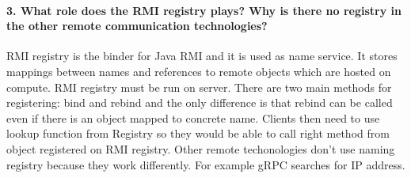 \documentclass{ds-report}
\begin{document}
	
	
	\paragraph{3. What role does the RMI registry plays? Why is there no registry in the other remote communication technologies? \newline}
	RMI registry is the binder for Java RMI and it is used as name service. It stores mappings between names and references to remote objects which
	are hosted on compute. RMI registry must be run on server. There are two main methods for registering: bind and rebind and the only difference is
	that rebind can be called even if there is an object mapped to concrete name. Clients then need to use lookup function from Registry so they would be
	able to call right method from object registered on RMI registry. Other remote techonologies don't use naming registry because they 
	work differently. For example gRPC searches for IP address.
	
	\clearpage
	
	
\end{document}

